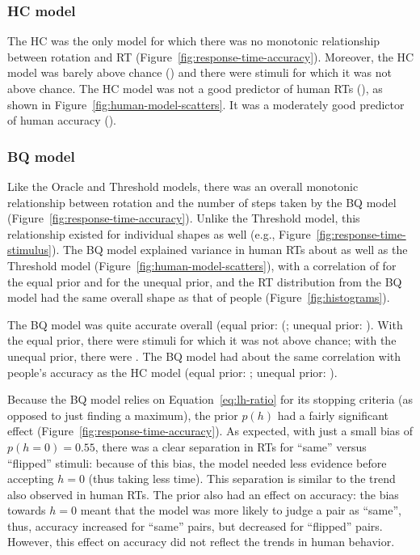 \documentclass[10pt,letterpaper]{article}
\newcommand{\Oc}[0]{Oracle}
\newcommand{\Th}[0]{Threshold}
\newcommand{\Hc}[0]{HC}
\newcommand{\Bq}[0]{BQ}
\begin{document}
\subsubsection{\Hc{} model}

The \Hc{} was the only model for which there was no monotonic
relationship between rotation and RT
(Figure~\ref{fig:response-time-accuracy}). Moreover, the \Hc{} model
was barely above chance (\HcAccuracy{}) and there were \HcNumChance{}
stimuli for which it was not above chance. The \Hc{} model was not a
good predictor of human RTs (\HcTimeCorr{}), as shown in
Figure~\ref{fig:human-model-scatters}. It was a moderately good
predictor of human accuracy (\HcAccuracyCorr{}).

\subsubsection{\Bq{} model}

Like the \Oc{} and \Th{} models, there was an overall monotonic
relationship between rotation and the number of steps taken by the
\Bq{} model (Figure~\ref{fig:response-time-accuracy}). Unlike the
\Th{} model, this relationship existed for individual shapes as well
(e.g., Figure~\ref{fig:response-time-stimulus}).  The \Bq{} model
explained variance in human RTs about as well as the \Th{} model
(Figure~\ref{fig:human-model-scatters}), with a correlation of
\BqTimeCorr{} for the equal prior and \BqpTimeCorr{} for the unequal
prior, and the RT distribution from the \Bq{} model had the same
overall shape as that of people (Figure~\ref{fig:histograms}).

The \Bq{} model was quite accurate overall (equal prior:
(\BqAccuracy{}; unequal prior: \BqpAccuracy{}). With the equal prior,
there were \BqNumChance{} stimuli for which it was not above chance;
with the unequal prior, there were \BqpNumChance{}. The \Bq{} model
had about the same correlation with people's accuracy as the \Hc{}
model (equal prior: \BqAccuracyCorr{}; unequal prior:
\BqpAccuracyCorr{}).

Because the \Bq{} model relies on Equation~\ref{eq:lh-ratio} for its
stopping criteria (as opposed to just finding a maximum), the prior
$p(h)$ had a fairly significant effect
(Figure~\ref{fig:response-time-accuracy}). As expected, with just a
small bias of $p(h=0)=0.55$, there was a clear separation in RTs for
``same'' versus ``flipped'' stimuli: because of this bias, the model
needed less evidence before accepting $h=0$ (thus taking less
time). This separation is similar to the trend also observed in human
RTs. The prior also had an effect on accuracy: the bias towards $h=0$
meant that the model was more likely to judge a pair as ``same'',
thus, accuracy increased for ``same'' pairs, but decreased for
``flipped'' pairs. However, this effect on accuracy did not reflect
the trends in human behavior.
\end{document}
